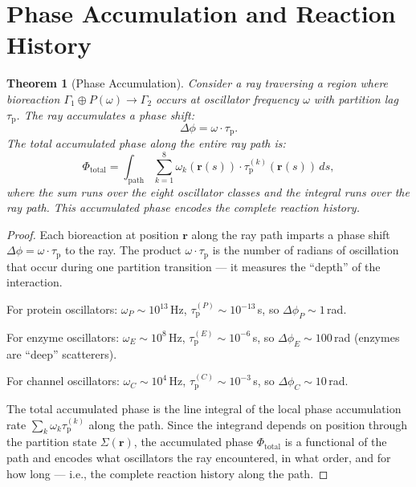\documentclass[11pt,twocolumn,a4paper]{article}
\newtheorem{theorem}{Theorem}[section]
\newcommand{\taup}{\tau_{\mathrm{p}}}
\begin{document}


\section{Phase Accumulation and Reaction History}
\label{sec:phase-accumulation}

\begin{theorem}[Phase Accumulation]
\label{thm:phase-accumulation}
Consider a ray traversing a region where bioreaction
$\Gamma_1 \oplus P(\omega) \to \Gamma_2$ occurs at oscillator
frequency $\omega$ with partition lag $\taup$. The ray accumulates
a phase shift:
\begin{equation}
\Delta\phi = \omega \cdot \taup.
\label{eq:phase-shift}
\end{equation}
The total accumulated phase along the entire ray path is:
\begin{equation}
\Phi_{\mathrm{total}} = \int_{\mathrm{path}} \sum_{k=1}^{8}
  \omega_k(\mathbf{r}(s)) \cdot \taup^{(k)}(\mathbf{r}(s)) \, ds,
\label{eq:total-phase}
\end{equation}
where the sum runs over the eight oscillator classes and the integral
runs over the ray path. This accumulated phase encodes the complete
reaction history.
\end{theorem}

\begin{proof}
Each bioreaction at position $\mathbf{r}$ along the ray path imparts
a phase shift $\Delta\phi = \omega \cdot \taup$ to the ray. The
product $\omega \cdot \taup$ is the number of radians of oscillation
that occur during one partition transition --- it measures the
``depth'' of the interaction.

For protein oscillators: $\omega_P \sim 10^{13}$\,Hz, $\taup^{(P)}
\sim 10^{-13}$\,s, so $\Delta\phi_P \sim 1$\,rad.

For enzyme oscillators: $\omega_E \sim 10^{8}$\,Hz, $\taup^{(E)}
\sim 10^{-6}$\,s, so $\Delta\phi_E \sim 100$\,rad (enzymes are
``deep'' scatterers).

For channel oscillators: $\omega_C \sim 10^{4}$\,Hz, $\taup^{(C)}
\sim 10^{-3}$\,s, so $\Delta\phi_C \sim 10$\,rad.

The total accumulated phase is the line integral of the local phase
accumulation rate $\sum_k \omega_k \taup^{(k)}$ along the path. Since
the integrand depends on position through the partition state
$\Sigma(\mathbf{r})$, the accumulated phase $\Phi_{\mathrm{total}}$ is
a functional of the path and encodes what oscillators the ray
encountered, in what order, and for how long --- i.e., the complete
reaction history along the path.
\end{proof}
\end{document}
